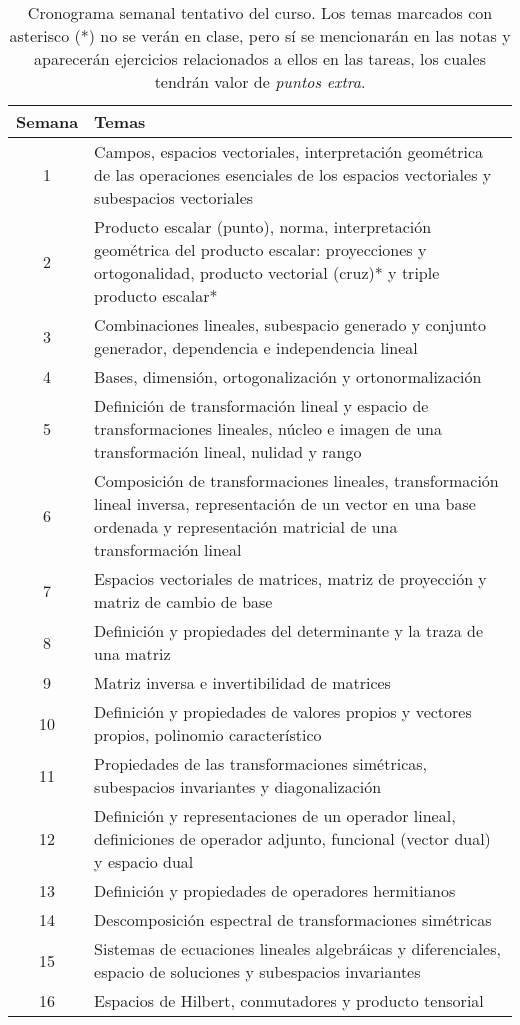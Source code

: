 \documentclass[12pt]{article}
\begin{document}
\begin{table}[ht]
    \centering
    \begin{tabularx}{\linewidth}{|c|X|}
    \hline Semana & Temas \\
    \hline 1 & Campos, espacios vectoriales, interpretación geométrica de las operaciones esenciales de los espacios vectoriales y subespacios vectoriales \\
    \hline 2 & Producto escalar (punto), norma, interpretación geométrica del producto escalar: proyecciones y ortogonalidad, producto vectorial (cruz)* y triple producto escalar* \\
    \hline 3 & Combinaciones lineales, subespacio generado y conjunto generador, dependencia e independencia lineal \\
    \hline 4 & Bases, dimensión, ortogonalización y ortonormalización \\
    \hline 5 & Definición de transformación lineal y espacio de transformaciones lineales, núcleo e imagen de una transformación lineal, nulidad y rango \\
    \hline 6 & Composición de transformaciones lineales, transformación lineal inversa, representación de un vector en una base ordenada y representación matricial de una transformación lineal \\
    \hline 7 & Espacios vectoriales de matrices, matriz de proyección y matriz de cambio de base \\
    \hline 8 & Definición y propiedades del determinante y la traza de una matriz \\
    \hline 9 & Matriz inversa e invertibilidad de matrices \\
    \hline 10 & Definición y propiedades de valores propios y vectores propios, polinomio característico \\
    \hline 11 & Propiedades de las transformaciones simétricas, subespacios invariantes y diagonalización \\
        \hline 12 & Definición y representaciones de un operador lineal, definiciones de operador adjunto, funcional (vector dual) y espacio dual \\
    \hline 13 & Definición y propiedades de operadores hermitianos \\
    \hline 14 & Descomposición espectral de transformaciones simétricas \\
    \hline 15 & Sistemas de ecuaciones lineales algebráicas y diferenciales, espacio de soluciones y subespacios invariantes \\
    \hline 16 & Espacios de Hilbert, conmutadores y producto tensorial  \\
    \hline
    \end{tabularx}
    \caption{Cronograma semanal tentativo del curso. Los temas marcados con asterisco (*) no se verán en clase, pero sí se mencionarán en las notas y aparecerán ejercicios relacionados a ellos en las tareas, los cuales tendrán valor de \emph{puntos extra}.}
    \label{Cronograma}
\end{table}{}
\end{document}
